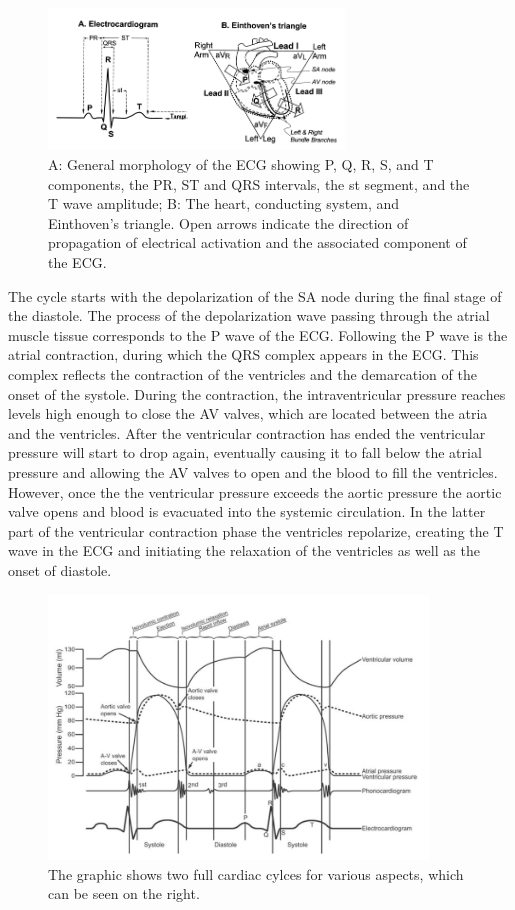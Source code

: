 \begin{figure}[ht]
\centering
\includegraphics[width=0.7\textwidth]{images/ecg.png}
\caption{A: General morphology of the ECG showing P, Q, R, S, and T components, the PR, ST and QRS intervals, the st segment, and the T wave amplitude; B: The heart, conducting system, and Einthoven's triangle. Open arrows indicate the direction of propagation of electrical activation and the associated component of the ECG.\citep{HANDBOOKPP}}
\label{ecgImg}
\end{figure}

The cycle starts with the depolarization of the SA node during the final stage of the diastole. The process of the depolarization wave passing through the atrial muscle tissue corresponds to the P wave of the ECG. Following the P wave is the atrial contraction, during which the QRS complex appears in the ECG. This complex reflects the contraction of the ventricles and the demarcation of the onset of the systole. During the contraction, the intraventricular pressure reaches levels high enough to close the AV valves, which are located between the atria and the ventricles. After the ventricular contraction has ended the ventricular pressure will start to drop again, eventually causing it to fall below the atrial pressure and allowing the AV valves to open and the blood to fill the ventricles. However, once the the ventricular pressure exceeds the aortic pressure the aortic valve opens and blood is evacuated into the systemic circulation. In the latter part of the ventricular contraction phase the ventricles repolarize, creating the T wave in the ECG and initiating the relaxation of the ventricles as well as the onset of diastole. 

\begin{figure}[ht]
\centering
\includegraphics[width=0.9\textwidth]{images/cycleImg.png}
\caption{The graphic shows two full cardiac cylces for various aspects, which can be seen on the right.\citep{HANDBOOKPP}}
\label{cycleImg}
\end{figure}

